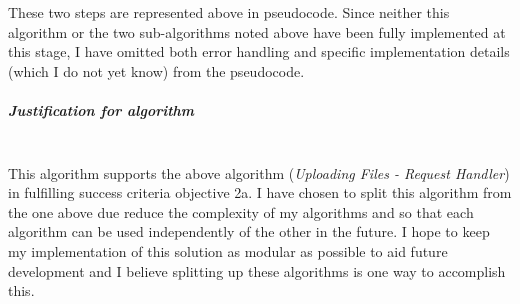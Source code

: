 \documentclass[../../main.tex]{subfiles}
\begin{document}
\noindent These two steps are represented above in pseudocode.
Since neither this algorithm or the two sub-algorithms noted above have been fully implemented at this stage,
I have omitted both error handling and specific implementation details (which I do not yet know) from the
pseudocode.

\subparagraph{Justification for algorithm}

\noindent \\ This algorithm supports the above algorithm (\textit{Uploading Files - Request Handler}) in
fulfilling success criteria objective 2a. I have chosen to split this algorithm from the one above due reduce
the complexity of my algorithms and so that each algorithm can be used independently of the other in the future.
I hope to keep my implementation of this solution as modular as possible to aid future development and I believe
splitting up these algorithms is one way to accomplish this.
\end{document}
